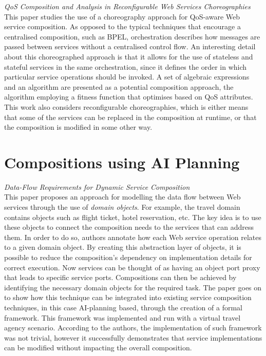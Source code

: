 \textit{QoS Composition and Analysis in Reconfigurable Web Services Choreographies \cite{kattepur2013qos}}\\
This paper studies the use of a choreography approach for QoS-aware Web service composition. As opposed to the typical techniques that
encourage a centralised composition, such as BPEL, orchestration describes how messages are passed between services without a centralised
control flow. An interesting detail about this choreographed approach is that it allows for the use of stateless and stateful services
in the same orchestration, since it defines the order in which particular service operations should be invoked. A set of algebraic expressions
and an algorithm are presented as a potential composition approach, the algorithm employing a fitness function that optimises based
on QoS attributes. This work also considers reconfigurable choreographies, which is either means that some of the services can be replaced
in the composition at runtime, or that the composition is modified in some other way.

\section{Compositions using AI Planning}

\textit{Data-Flow Requirements for Dynamic Service Composition \cite{kazhamiakin2013data}}\\
This paper proposes an approach for modelling the data flow between Web services through the use of \textit{domain objects}. For example,
the travel domain contains objects such as flight ticket, hotel reservation, etc. The key idea is to use these objects to connect the composition
needs to the services that can address them. In order to do so, authors annotate how each Web service operation relates to a given domain object.
By creating this abstraction layer of objects, it is possible to reduce the composition's dependency on implementation details for correct
execution. Now services can be thought of as having an object port proxy that leads to specific service ports. Compositions can then
be achieved by identifying the necessary domain objects for the required task. The paper goes on to show how this technique can be integrated
into existing service composition techniques, in this case AI-planning based, through the creation of a formal framework. This framework was
implemented and run with a virtual travel agency scenario. According to the authors, the implementation of such framework was not trivial, however
it successfully demonstrates that service implementations can be modified without impacting the overall composition.

